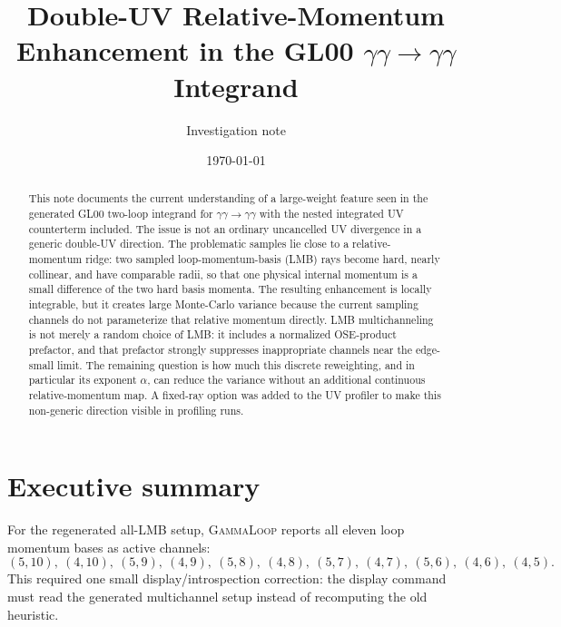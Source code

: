 \documentclass[11pt]{article}
\title{Double-UV Relative-Momentum Enhancement in the GL00 \texorpdfstring{$\gamma\gamma\to\gamma\gamma$}{aa to aa} Integrand}
\author{Investigation note}
\date{\today}
\newcommand{\GL}{\textsc{GammaLoop}}
\begin{document}
\maketitle

\begin{abstract}
This note documents the current understanding of a large-weight feature seen in
the generated GL00 two-loop integrand for
$\gamma\gamma\to\gamma\gamma$ with the nested integrated UV counterterm
included.  The issue is not an ordinary uncancelled UV divergence in a generic
double-UV direction.  The problematic samples lie close to a relative-momentum
ridge: two sampled loop-momentum-basis (LMB) rays become hard, nearly collinear,
and have comparable radii, so that one physical internal momentum is a small
difference of the two hard basis momenta.  The resulting enhancement is locally
integrable, but it creates large Monte-Carlo variance because the current
sampling channels do not parameterize that relative momentum directly.  LMB
multichanneling is not merely a random choice of LMB: it includes a normalized
OSE-product prefactor, and that prefactor strongly suppresses inappropriate
channels near the edge-small limit.  The remaining question is how much this
discrete reweighting, and in particular its exponent $\alpha$, can reduce the
variance without an additional continuous relative-momentum map.  A fixed-ray
option was added to the UV profiler to make this non-generic direction visible
in profiling runs.
\end{abstract}

\section{Executive summary}

For the regenerated all-LMB setup, \GL{} reports all eleven loop momentum bases
as active channels:
\[
  (5,10),\ (4,10),\ (5,9),\ (4,9),\ (5,8),\ (4,8),\ (5,7),\ (4,7),\ (5,6),
  \ (4,6),\ (4,5).
\]
This required one small display/introspection correction: the display command
must read the generated multichannel setup instead of recomputing the old
heuristic.
\end{document}
